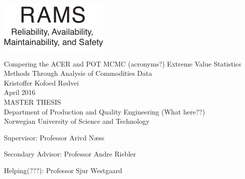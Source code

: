
\thispagestyle{empty}
\includegraphics[scale=1.1]{fig/rams}
\mbox{}\\[6pc]
\begin{center}
\Huge{Compering the ACER and POT MCMC (acronyms?) Extreme Value Statistics Methods Through Analysis of Commodities Data}\\[2pc]

\Large{Kristoffer Kofoed R{{\o}}dvei}\\[1pc]
\large{April 2016}\\[2pc]

MASTER THESIS\\
Department of Production and Quality Engineering (What here??)\\
Norwegian University of Science and Technology
\end{center}
\vfill

\noindent Supervisor: Professor Arivd N{{\ae}}ss

\noindent Secondary Advisor: Professor Andre Riebler

\noindent Helping(???): Professor Sjur Westgaard


